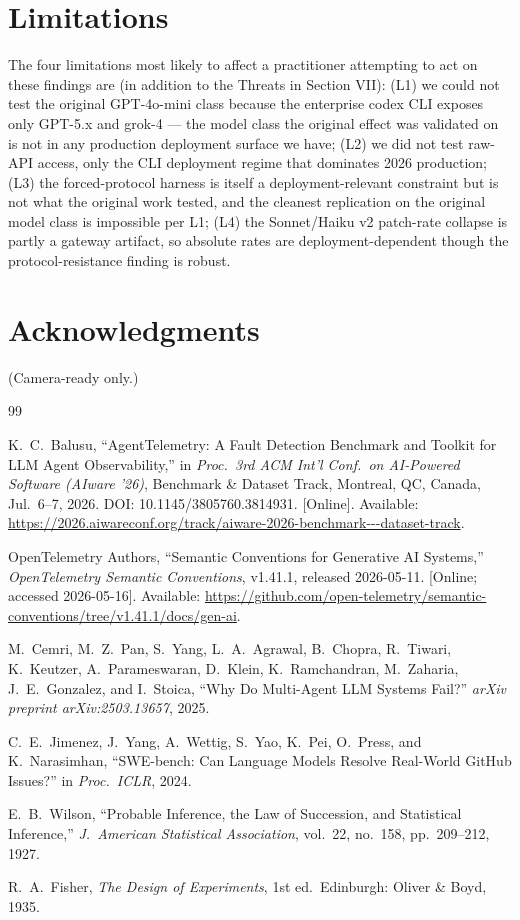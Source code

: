 \documentclass[journal]{IEEEtran}
\begin{document}
\section*{Limitations}

The four limitations most likely to affect a practitioner attempting to act on these findings are (in addition to the Threats in Section VII): (L1) we could not test the original GPT-4o-mini class because the enterprise codex CLI exposes only GPT-5.x and grok-4 --- the model class the original effect was validated on is not in any production deployment surface we have; (L2) we did not test raw-API access, only the CLI deployment regime that dominates 2026 production; (L3) the forced-protocol harness is itself a deployment-relevant constraint but is not what the original work tested, and the cleanest replication on the original model class is impossible per L1; (L4) the Sonnet/Haiku v2 patch-rate collapse is partly a gateway artifact, so absolute rates are deployment-dependent though the protocol-resistance finding is robust.

\section*{Acknowledgments}

(Camera-ready only.)

\begin{thebibliography}{99}

K.~C.~Balusu, ``AgentTelemetry: A Fault Detection Benchmark and Toolkit for LLM Agent Observability,''
in \emph{Proc.\ 3rd ACM Int'l Conf.\ on AI-Powered Software (AIware '26)}, Benchmark \& Dataset Track,
Montreal, QC, Canada, Jul.\ 6--7, 2026.
DOI: 10.1145/3805760.3814931. [Online]. Available:
\url{https://2026.aiwareconf.org/track/aiware-2026-benchmark---dataset-track}.

{OpenTelemetry Authors}, ``Semantic Conventions for Generative AI Systems,''
\emph{OpenTelemetry Semantic Conventions}, v1.41.1, released 2026-05-11. [Online; accessed 2026-05-16]. Available:
\url{https://github.com/open-telemetry/semantic-conventions/tree/v1.41.1/docs/gen-ai}.

M.~Cemri, M.~Z.~Pan, S.~Yang, L.~A.~Agrawal, B.~Chopra, R.~Tiwari, K.~Keutzer, A.~Parameswaran,
D.~Klein, K.~Ramchandran, M.~Zaharia, J.~E.~Gonzalez, and I.~Stoica,
``Why Do Multi-Agent LLM Systems Fail?''
\emph{arXiv preprint arXiv:2503.13657}, 2025.

C.~E.~Jimenez, J.~Yang, A.~Wettig, S.~Yao, K.~Pei, O.~Press, and K.~Narasimhan,
``SWE-bench: Can Language Models Resolve Real-World GitHub Issues?''
in \emph{Proc.\ ICLR}, 2024.

E.~B.~Wilson, ``Probable Inference, the Law of Succession, and Statistical Inference,''
\emph{J.\ American Statistical Association}, vol.\ 22, no.\ 158, pp.\ 209--212, 1927.

R.~A.~Fisher, \emph{The Design of Experiments}, 1st ed.\ Edinburgh: Oliver \& Boyd, 1935.

\end{thebibliography}
\end{document}
